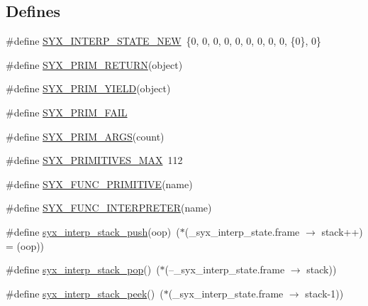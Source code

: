 \subsection*{Defines}
\begin{CompactItemize}
\item 
\#define \hyperlink{syx-interp_8h_36ed8b83722f6b5db96c921d75914c8b}{SYX\_\-INTERP\_\-STATE\_\-NEW}~\{0, 0, 0, 0, 0, 0, 0, 0, 0, \{0\}, 0\}
\item 
\#define \hyperlink{syx-interp_8h_1fbd6d0a8b4dd7990d38e6ecb49a4a75}{SYX\_\-PRIM\_\-RETURN}(object)
\item 
\#define \hyperlink{syx-interp_8h_f3fa65412c46c97a00e4a496bfb07abe}{SYX\_\-PRIM\_\-YIELD}(object)
\item 
\#define \hyperlink{syx-interp_8h_0662d99c9b3fec34c01003ae66463756}{SYX\_\-PRIM\_\-FAIL}
\item 
\#define \hyperlink{syx-interp_8h_d4c3512abbc543dc8804970eef8b2ea3}{SYX\_\-PRIM\_\-ARGS}(count)
\item 
\#define \hyperlink{syx-interp_8h_74a8bedcef0fe39a058e5c6beb5f6662}{SYX\_\-PRIMITIVES\_\-MAX}~112
\item 
\#define \hyperlink{syx-interp_8h_6d605406b1f829cbafb73bff1b959841}{SYX\_\-FUNC\_\-PRIMITIVE}(name)
\item 
\#define \hyperlink{syx-interp_8h_c8a67ae79ddd303b4bbdbc71573a5090}{SYX\_\-FUNC\_\-INTERPRETER}(name)
\item 
\#define \hyperlink{syx-interp_8h_72950794ade0181c2f6dbb4f7eb56188}{syx\_\-interp\_\-stack\_\-push}(oop)~($\ast$(\_\-syx\_\-interp\_\-state.frame $\rightarrow$ stack++) = (oop))
\item 
\#define \hyperlink{syx-interp_8h_45923c7b4635a8225267ddd73d208b1d}{syx\_\-interp\_\-stack\_\-pop}()~($\ast$(--\_\-syx\_\-interp\_\-state.frame $\rightarrow$ stack))
\item 
\#define \hyperlink{syx-interp_8h_441849bafd3d13926bea2008361f6d47}{syx\_\-interp\_\-stack\_\-peek}()~($\ast$(\_\-syx\_\-interp\_\-state.frame $\rightarrow$ stack-1))
\end{CompactItemize}
